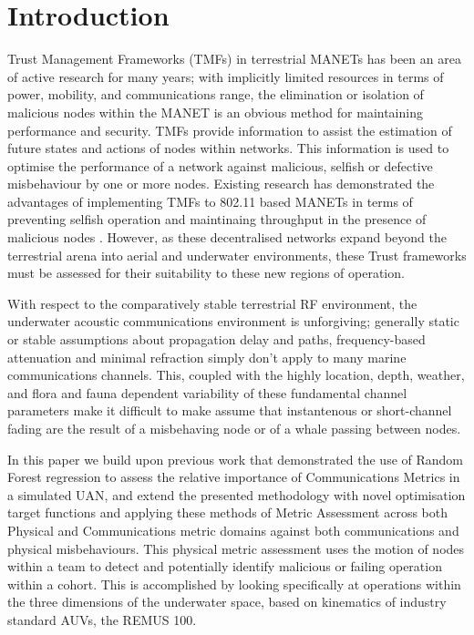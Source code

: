 \documentclass[conference]{IEEEtran}
\begin{document}
\section{Introduction}
\IEEEpubidadjcol

Trust Management Frameworks (TMFs) in terrestrial MANETs has been an area of active research for many years; with implicitly limited resources in terms of power, mobility, and communications range, the elimination or isolation of malicious nodes within the MANET is an obvious method for maintaining performance and security. 
TMFs provide information to assist the estimation of future states and actions of nodes within networks. 
This information is used to optimise the performance of a network against malicious, selfish or defective misbehaviour by one or more nodes. 
Existing research has demonstrated the advantages of implementing TMFs to 802.11 based MANETs in terms of preventing selfish operation and maintinaing throughput in the presence of malicious nodes \cite{Li2007,Buchegger2002}.
However, as these decentralised networks expand beyond the terrestrial arena into aerial and underwater environments, these Trust frameworks must be assessed for their suitability to these new regions of operation.

With respect to the comparatively stable terrestrial RF environment, the underwater acoustic communications environment is unforgiving; generally static or stable assumptions about propagation delay and paths, frequency-based attenuation and minimal refraction simply don't apply to many marine communications channels.
This, coupled with the highly location, depth, weather, and flora and fauna dependent variability of these fundamental channel parameters make it difficult to make assume that instantenous or short-channel fading are the result of a misbehaving node or of a whale passing between nodes.

In this paper we build upon previous work \cite{Bolster2015} that demonstrated the use of  Random Forest regression \cite{Breiman2001} to assess the relative importance of Communications Metrics in a simulated UAN, and extend the presented methodology with novel optimisation target functions and applying these methods of Metric Assessment across both Physical and Communications metric domains against both communications and physical misbehaviours.
This physical metric assessment uses the motion of nodes within a team to detect and potentially identify malicious or failing operation within a cohort.
This is accomplished by looking specifically at operations within the three dimensions of the underwater space, based on kinematics of industry standard AUVs, the REMUS 100.
\end{document}
